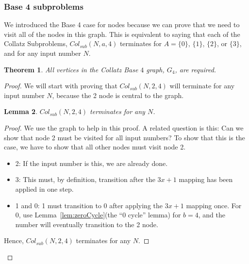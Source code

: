 \documentclass[12pt]{article}
\newtheorem{theorem}{Theorem}[section]
\newtheorem{lemma}[theorem]{Lemma}
\theoremstyle{definition}
\begin{document}
\subsubsection{Base 4 subproblems} \label{subsubsec:base4subproblems}
We introduced the Base 4 case for nodes because we can prove that we need to visit all of the nodes in this graph. This is equivalent to saying that each of the Collatz Subproblems, $Col_{sub}(N,a,4)$ terminates
for $A = \{0\}$, $\{1\}$, $\{2\}$, or $\{3\}$, and for any input number $N$. 
\begin{theorem}
All vertices in the Collatz Base $4$ graph, $G_4$, are required.
\end{theorem}
\begin{proof}
We will start with proving that $Col_{sub}(N,2,4)$ will terminate for any input number $N$, because the 2 node is central to the graph.\par
\begin{lemma}
\label{lem:collatzSubTwoModFour}
$Col_{sub}(N,2,4)$ terminates for any $N$.
\end{lemma} 
\begin{proof}
We use the graph to help in this proof. A related question is this: Can we show that node 2 must be visited for all input numbers? To show that this is the case, we have to show that all other nodes must visit node 2. 
\begin{itemize}
    \item 2: If the input number is this, we are already done.
    \item 3: This must, by definition, transition after the $3x+1$ mapping has been applied in one step.
    \item 1 and 0: 1 must transition to 0 after applying the $3x+1$ mapping once. For 0, use Lemma~\ref{lem:zeroCycle}(the ``0 cycle'' lemma) for $b = 4$, and the number will eventually transition to the 2 node.
\end{itemize}
Hence, $Col_{sub}(N,2,4)$ terminates for any $N$.
\end{proof} \par


\end{proof}
\end{document}
